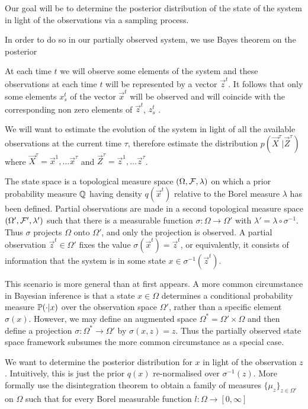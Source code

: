 Our goal will be to determine the posterior distribution of the state of the system in light of the observations via a sampling process.

In order to do so in our partially observed system, we use Bayes theorem on the posterior

At each time $t$ we will observe some elements of the system and these observations at each time $t$ will be represented by a vector $\vec{z}^t$. It follows that only some elements $x^t_s$ of the vector $\vec{x}^t$ will be observed and will coincide with the corresponding non zero elements of $\vec{z}^t$, $z^t_s$ . 

We will want to estimate the evolution of the system in light of all the available observations at the current time $\tau$, therefore estimate the distribution $p(\vec{X}^{\tau} | \vec{Z}^{\tau})$ where $\vec{X}^{\tau} = \vec{x}^1, \dots \vec{x}^\tau$ and $\vec{Z}^{\tau} = \vec{z}^1, \dots \vec{z}^\tau$.


The state space is a topological measure space $(\Omega, \F, \lambda)$ on which a prior probability measure $\Q$ having density $q(\vec{x}^t)$ relative to the Borel measure $\lambda$ has been defined. Partial observations are made in a second topological measure space $(\Omega', \F', \lambda')$ such that there is a measurable function $\sigma : \Omega \rightarrow \Omega'$ with $\lambda' = \lambda \circ \sigma^{-1}$. Thus $\sigma$ projects $\Omega$ onto $\Omega'$, and only the projection is observed. A partial observation $\vec{z}^t \in \Omega'$ fixes the value $\sigma(\vec{x}^t) = \vec{z}^t$, or equivalently, it consists of information that the system is in some state $x \in \sigma^{-1} (\vec{z}^t)$.

This scenario is more general than at first appears. A more common circumstance in Bayesian inference is that a state $x \in \Omega$ determines a conditional probability measure $\P(\cdot|x)$ over the observation space $\Omega'$, rather than a specific element $\sigma(x)$. However, we may define an augmented space $\Omega^* = \Omega' \times \Omega$ and then define a projection $\sigma : \Omega^* \rightarrow \Omega'$ by $\sigma(x, z) = z$. Thus the partially observed state space framework subsumes the more common circumstance as a special case.

We want to determine the posterior distribution for $x$ in light of the observation $z$. Intuitively, this is just the prior $q(x)$ re-normalised over $\sigma^{-1}(z)$. More formally use the disintegration theorem to obtain a family of measures $\{ \mu_z \}_{z \in \Omega'}$ on $\Omega$ such that for every Borel measurable function $l : \Omega \rightarrow [0, \infty]$ 

